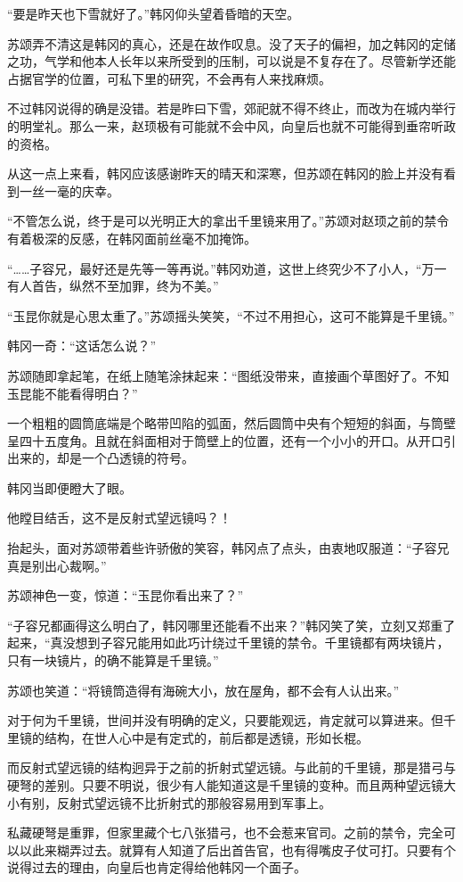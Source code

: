 “要是昨天也下雪就好了。”韩冈仰头望着昏暗的天空。

苏颂弄不清这是韩冈的真心，还是在故作叹息。没了天子的偏袒，加之韩冈的定储之功，气学和他本人长年以来所受到的压制，可以说是不复存在了。尽管新学还能占据官学的位置，可私下里的研究，不会再有人来找麻烦。

不过韩冈说得的确是没错。若是昨曰下雪，郊祀就不得不终止，而改为在城内举行的明堂礼。那么一来，赵顼极有可能就不会中风，向皇后也就不可能得到垂帘听政的资格。

从这一点上来看，韩冈应该感谢昨天的晴天和深寒，但苏颂在韩冈的脸上并没有看到一丝一毫的庆幸。

“不管怎么说，终于是可以光明正大的拿出千里镜来用了。”苏颂对赵顼之前的禁令有着极深的反感，在韩冈面前丝毫不加掩饰。

“……子容兄，最好还是先等一等再说。”韩冈劝道，这世上终究少不了小人，“万一有人首告，纵然不至加罪，终为不美。”

“玉昆你就是心思太重了。”苏颂摇头笑笑，“不过不用担心，这可不能算是千里镜。”

韩冈一奇：“这话怎么说？”

苏颂随即拿起笔，在纸上随笔涂抹起来：“图纸没带来，直接画个草图好了。不知玉昆能不能看得明白？”

一个粗粗的圆筒底端是个略带凹陷的弧面，然后圆筒中央有个短短的斜面，与筒壁呈四十五度角。且就在斜面相对于筒壁上的位置，还有一个小小的开口。从开口引出来的，却是一个凸透镜的符号。

韩冈当即便瞪大了眼。

他瞠目结舌，这不是反射式望远镜吗？！

抬起头，面对苏颂带着些许骄傲的笑容，韩冈点了点头，由衷地叹服道：“子容兄真是别出心裁啊。”

苏颂神色一变，惊道：“玉昆你看出来了？”

“子容兄都画得这么明白了，韩冈哪里还能看不出来？”韩冈笑了笑，立刻又郑重了起来，“真没想到子容兄能用如此巧计绕过千里镜的禁令。千里镜都有两块镜片，只有一块镜片，的确不能算是千里镜。”

苏颂也笑道：“将镜筒造得有海碗大小，放在屋角，都不会有人认出来。”

对于何为千里镜，世间并没有明确的定义，只要能观远，肯定就可以算进来。但千里镜的结构，在世人心中是有定式的，前后都是透镜，形如长棍。

而反射式望远镜的结构迥异于之前的折射式望远镜。与此前的千里镜，那是猎弓与硬弩的差别。只要不明说，很少有人能知道这是千里镜的变种。而且两种望远镜大小有别，反射式望远镜不比折射式的那般容易用到军事上。

私藏硬弩是重罪，但家里藏个七八张猎弓，也不会惹来官司。之前的禁令，完全可以以此来糊弄过去。就算有人知道了后出首告官，也有得嘴皮子仗可打。只要有个说得过去的理由，向皇后也肯定得给他韩冈一个面子。


